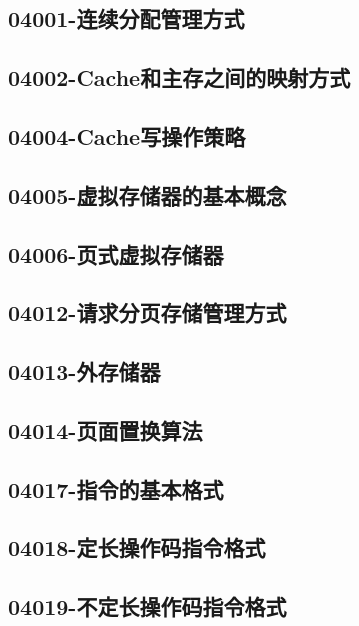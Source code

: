 \subsection{04001-连续分配管理方式}

\subsection{04002-Cache和主存之间的映射方式}

\subsection{04004-Cache写操作策略}

\subsection{04005-虚拟存储器的基本概念}

\subsection{04006-页式虚拟存储器}

\subsection{04012-请求分页存储管理方式}

\subsection{04013-外存储器}

\subsection{04014-页面置换算法}

\subsection{04017-指令的基本格式}

\subsection{04018-定长操作码指令格式}

\subsection{04019-不定长操作码指令格式}

